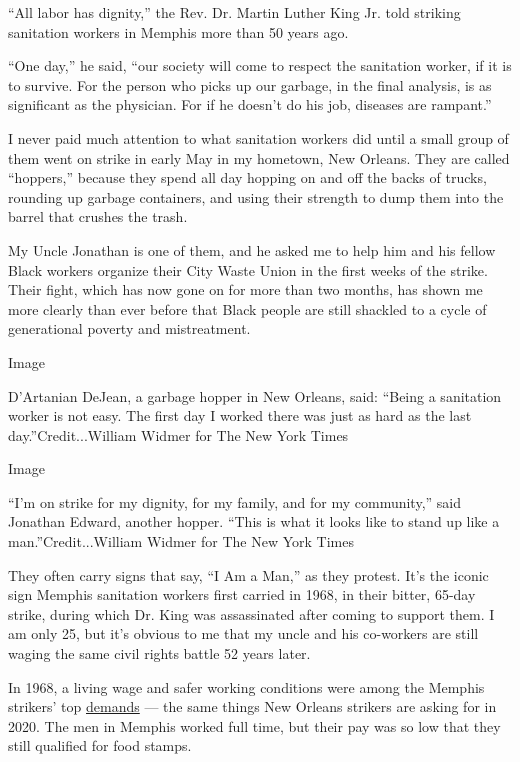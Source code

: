 ``All labor has dignity,'' the Rev. Dr. Martin Luther King Jr. told
striking sanitation workers in Memphis more than 50 years ago.

``One day,'' he said, ``our society will come to respect the sanitation
worker, if it is to survive. For the person who picks up our garbage, in
the final analysis, is as significant as the physician. For if he
doesn't do his job, diseases are rampant.''

I never paid much attention to what sanitation workers did until a small
group of them went on strike in early May in my hometown, New Orleans.
They are called ``hoppers,'' because they spend all day hopping on and
off the backs of trucks, rounding up garbage containers, and using their
strength to dump them into the barrel that crushes the trash.

My Uncle Jonathan is one of them, and he asked me to help him and his
fellow Black workers organize their City Waste Union in the first weeks
of the strike. Their fight, which has now gone on for more than two
months, has shown me more clearly than ever before that Black people are
still shackled to a cycle of generational poverty and mistreatment.

Image

D'Artanian DeJean, a garbage hopper in New Orleans, said: ``Being a
sanitation worker is not easy. The first day I worked there was just as
hard as the last day.''Credit...William Widmer for The New York Times

Image

``I'm on strike for my dignity, for my family, and for my community,''
said Jonathan Edward, another hopper. ``This is what it looks like to
stand up like a man.''Credit...William Widmer for The New York Times

They often carry signs that say, ``I Am a Man,'' as they protest. It's
the iconic sign Memphis sanitation workers first carried in 1968, in
their bitter, 65-day strike, during which Dr. King was assassinated
after coming to support them. I am only 25, but it's obvious to me that
my uncle and his co-workers are still waging the same civil rights
battle 52 years later.

In 1968, a living wage and safer working conditions were among the
Memphis strikers' top
\href{https://kinginstitute.stanford.edu/encyclopedia/memphis-sanitation-workers-strike}{demands}
--- the same things New Orleans strikers are asking for in 2020. The men
in Memphis worked full time, but their pay was so low that they still
qualified for food stamps.

